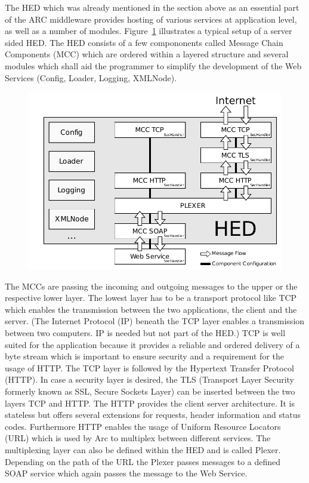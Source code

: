 The HED which was already mentioned in the section above as an essential part of the ARC middleware provides hosting of various services at application level, as well as a number of modules. Figure~\ref{fig:HED_internal} illustrates a typical setup of a server sided HED. The HED consists of a few compononents called Message Chain Components (MCC) which are ordered within a layered structure and several \textcolor{urgent}{modules} which shall aid the programmer to simplify the development of the Web Services (Config, Loader, Logging, XMLNode).
%
\begin{figure}[htb]
	\centering
	\includegraphics[width=14cm]{tex_introduction/HED.pdf}
\label{fig:HED_internal}
\end{figure}
The MCCs are passing the incoming and outgoing messages to the upper or the respective lower layer.
The lowest layer has to be a transport protocol like TCP which enables the transmission between the two applications, the client and the server. (The Internet Protocol (IP) beneath the TCP layer enables a transmission between two computers. IP is needed but not part of the HED.) TCP is well suited for the application because it provides a reliable and ordered delivery of a byte stream which is important to ensure security and a requirement for the usage of HTTP.
The TCP layer is followed by the Hypertext Transfer Protocol (HTTP). 
In case a security layer is desired, the TLS (Transport Layer Security formerly known as SSL, Secure Sockets Layer) can be inserted between the two layers TCP and HTTP.
The HTTP provides the client server architecture. It is stateless but offers several extensions for requests, header information and status codes. Furthermore HTTP enables the usage of Uniform Resource Locators (URL) which is used by Arc to multiplex between different services. The multiplexing layer can also be defined within the HED and is called Plexer. Depending on the path of the URL the Plexer passes messages to a defined SOAP service which again passes the message to the Web Service.\\


